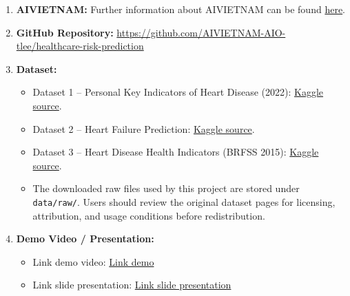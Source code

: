 \documentclass[12pt]{ai_conquer2026}
\begin{document}
\newpage
\begin{appendices}
\begin{enumerate}
\item \textbf{AIVIETNAM:} Further information about AIVIETNAM can be found \href{https://aivietnam.edu.vn/}{here}.
\item \textbf{GitHub Repository:} \url{https://github.com/AIVIETNAM-AIO-tlee/healthcare-risk-prediction}
\item \textbf{Dataset:}
\begin{itemize}
    \item Dataset 1 -- Personal Key Indicators of Heart Disease (2022):
    \href{https://www.kaggle.com/datasets/kamilpytlak/personal-key-indicators-of-heart-disease}{Kaggle source}.
    \item Dataset 2 -- Heart Failure Prediction:
    \href{https://www.kaggle.com/datasets/fedesoriano/heart-failure-prediction}{Kaggle source}.
    \item Dataset 3 -- Heart Disease Health Indicators (BRFSS 2015):
    \href{https://www.kaggle.com/datasets/alexteboul/heart-disease-health-indicators-dataset}{Kaggle source}.
    \item The downloaded raw files used by this project are stored under
    \texttt{data/raw/}. Users should review the original dataset pages for
    licensing, attribution, and usage conditions before redistribution.
\end{itemize}
\item \textbf{Demo Video / Presentation:}
\begin{itemize}
    \item Link demo video: \href{https://www.youtube.com/watch?v=iwFmqRy-ldU}{Link demo}
    \item Link slide presentation: \href{https://drive.google.com/file/d/19ftotvEal-7DuOh9jbJ-8TdZjnsm8Tqi/view?usp=sharing}{Link slide presentation}
\end{itemize}
\end{enumerate}
\end{appendices}
\end{document}
